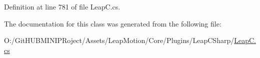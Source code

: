 Definition at line 781 of file Leap\+C.\+cs.



The documentation for this class was generated from the following file\+:\begin{DoxyCompactItemize}
\item 
O\+:/\+Git\+H\+U\+B\+M\+I\+N\+I\+P\+Roject/\+Assets/\+Leap\+Motion/\+Core/\+Plugins/\+Leap\+C\+Sharp/\mbox{\hyperlink{_leap_c_8cs}{Leap\+C.\+cs}}\end{DoxyCompactItemize}
